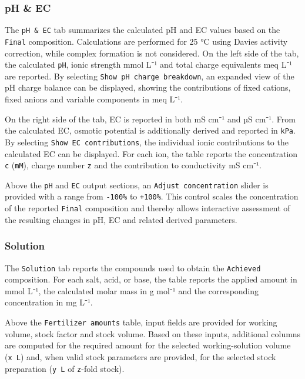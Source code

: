 \documentclass[
  letterpaper,
  DIV=11,
  numbers=noendperiod]{scrreprt}
\begin{document}
\subsubsection{pH \& EC}\label{ph-ec}

The \texttt{pH\ \&\ EC} tab summarizes the calculated pH and EC values
based on the \texttt{Final} composition. Calculations are performed for
25 °C using Davies activity correction, while complex formation is not
considered. On the left side of the tab, the calculated \texttt{pH},
ionic strength mmol L⁻¹ and total charge equivalents meq L⁻¹ are
reported. By selecting \texttt{Show\ pH\ charge\ breakdown}, an expanded
view of the pH charge balance can be displayed, showing the
contributions of fixed cations, fixed anions and variable components in
meq L⁻¹.

On the right side of the tab, EC is reported in both mS cm⁻¹ and µS
cm⁻¹. From the calculated EC, osmotic potential is additionally derived
and reported in \texttt{kPa}. By selecting
\texttt{Show\ EC\ contributions}, the individual ionic contributions to
the calculated EC can be displayed. For each ion, the table reports the
concentration \texttt{c} (\texttt{mM}), charge number \texttt{z} and the
contribution to conductivity mS cm⁻¹.

Above the \texttt{pH} and \texttt{EC} output sections, an
\texttt{Adjust\ concentration} slider is provided with a range from
\texttt{-100\%} to \texttt{+100\%}. This control scales the
concentration of the reported \texttt{Final} composition and thereby
allows interactive assessment of the resulting changes in pH, EC and
related derived parameters.

\subsubsection{Solution}\label{solution}

The \texttt{Solution} tab reports the compounds used to obtain the
\texttt{Achieved} composition. For each salt, acid, or base, the table
reports the applied amount in mmol L⁻¹, the calculated molar mass in g
mol⁻¹ and the corresponding concentration in mg L⁻¹.

Above the \texttt{Fertilizer\ amounts} table, input fields are provided
for working volume, stock factor and stock volume. Based on these
inputs, additional columns are computed for the required amount for the
selected working-solution volume (\texttt{x\ L}) and, when valid stock
parameters are provided, for the selected stock preparation
(\texttt{y\ L} of \texttt{z}-fold stock).
\end{document}
